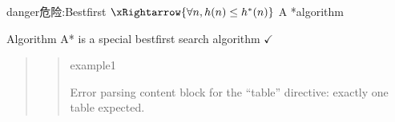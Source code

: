 \documentclass[letterpaper,10pt,english]{sphinxmanual}
\begin{document}
\begin{sphinxadmonition}{danger}{危险:}{Best\sphinxhyphen{}first \protect\(\xRightarrow{\forall n, h(n)\leq h^*(n)}\protect\) A *algorithm}

\sphinxAtStartPar
Algorithm A* is a special best\sphinxhyphen{}first search algorithm \(\pmb{\checkmark}\)️
\begin{quote}
\begin{quote}

\sphinxAtStartPar
example1

\sphinxAtStartPar
Error parsing content block for the “table” directive: exactly one table expected.

\begin{sphinxVerbatim}[commandchars=\\\{\}]
 

      
\end{sphinxVerbatim}

\end{quote}
\end{quote}
\end{sphinxadmonition}
\end{document}

